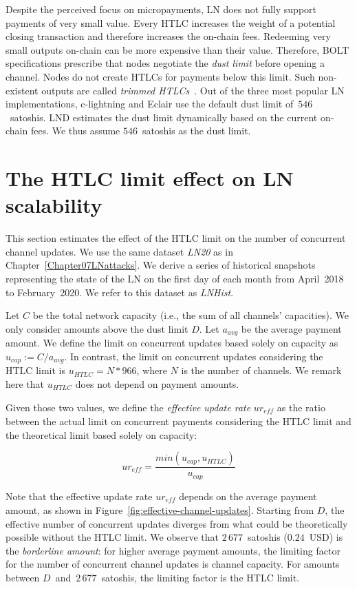 Despite the perceived focus on micropayments, LN does not fully support payments of very small value.
Every HTLC increases the weight of a potential closing transaction and therefore increases the on-chain fees.
Redeeming very small outputs on-chain can be more expensive than their value.
Therefore, BOLT specifications prescribe that nodes negotiate the \textit{dust limit} before opening a channel.
Nodes do not create HTLCs for payments below this limit.
Such non-existent outputs are called \textit{trimmed HTLCs}~\cite{BOLT3Trimmed}.
Out of the three most popular LN implementations, c-lightning and Eclair use the default dust limit of~$546$~satoshis.
LND estimates the dust limit dynamically based on the current on-chain fees.
We thus assume $546$~satoshis as the dust limit.


\section{The HTLC limit effect on LN scalability}

This section estimates the effect of the HTLC limit on the number of concurrent channel updates.
We use the same dataset \textit{LN20} as in Chapter~\ref{Chapter07LNattacks}.
We derive a series of historical snapshots representing the state of the LN on the first day of each month from April~2018 to February~2020.
We refer to this dataset as \textit{LNHist}.

Let $C$ be the total network capacity (i.e., the sum of all channels' capacities).
We only consider amounts above the dust limit $D$.
Let $a_\textit{avg}$ be the average payment amount.
We define the limit on concurrent updates based solely on capacity as $u_\textit{cap} := C / a_\textit{avg}$.
In contrast, the limit on concurrent updates considering the HTLC limit is $u_\textit{HTLC} = N * 966$, where $N$ is the number of channels.
We remark here that $u_\textit{HTLC}$ does not depend on payment amounts.

Given those two values, we define the \textit{effective update rate} $ur_\textit{eff}$ as the ratio between the actual limit on concurrent payments considering the HTLC limit and the theoretical limit based solely on capacity:

\[ur_\textit{eff} = \frac{min(u_\textit{cap}, u_\textit{HTLC})}{u_\textit{cap}}\]

Note that the effective update rate $ur_\textit{eff}$ depends on the average payment amount, as shown in Figure~\ref{fig:effective-channel-updates}.
Starting from $D$, the effective number of concurrent updates diverges from what could be theoretically possible without the HTLC limit.
We observe that $2\,677$~satoshis ($0.24$~USD) is the \textit{borderline amount}: for higher average payment amounts, the limiting factor for the number of concurrent channel updates is channel capacity.
For amounts between $D$~and~$2\,677$~satoshis, the limiting factor is the HTLC limit.

